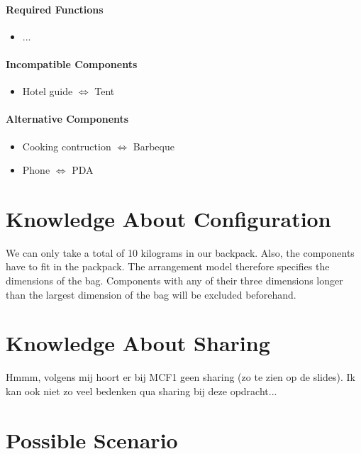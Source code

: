 \documentclass[a4paper,11pt]{article}
\begin{document}
\paragraph{Required Functions}

\begin{itemize}
\item ...
\end{itemize}

\paragraph{Incompatible Components}

\begin{itemize}
\item Hotel guide $\Leftrightarrow$ Tent
\end{itemize}

\paragraph{Alternative Components}

\begin{itemize}
\item Cooking contruction $\Leftrightarrow$ Barbeque
\item Phone $\Leftrightarrow$ PDA
\end{itemize}


\section*{Knowledge About Configuration}

We can only take a total of 10 kilograms in our backpack.
Also, the components have to fit in the packpack.
The arrangement model therefore specifies the dimensions of the bag. 
Components with any of their three dimensions longer than the largest dimension 
of the bag will be excluded beforehand.


\section*{Knowledge About Sharing}

Hmmm, volgens mij hoort er bij MCF1 geen sharing (zo te zien
op de slides). Ik kan ook niet zo veel bedenken qua sharing
bij deze opdracht...


\section*{Possible Scenario}
\end{document}
